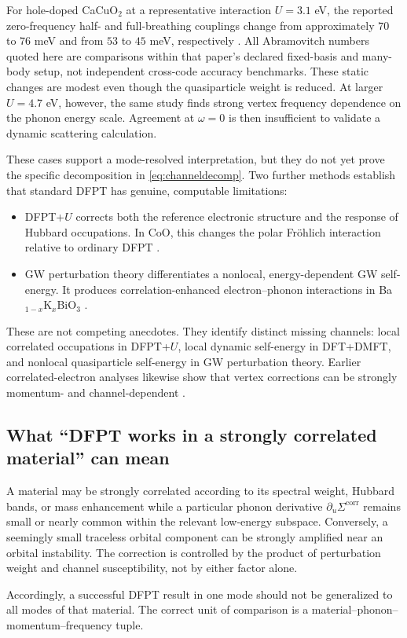 For hole-doped CaCuO$_2$ at a representative interaction $U=3.1$ eV, the reported
zero-frequency half- and full-breathing couplings change from approximately
$70$ to $76$ meV and from $53$ to $45$ meV, respectively
\citep{Abramovitch2025}.  All Abramovitch numbers quoted here are comparisons
within that paper's declared fixed-basis and many-body setup, not independent
cross-code accuracy benchmarks.  These static changes are modest even though the
quasiparticle weight is reduced.  At larger $U=4.7$ eV, however, the same study
finds strong vertex frequency dependence on the phonon energy scale.  Agreement at
$\omega=0$ is then insufficient to validate a dynamic scattering calculation.

These cases support a mode-resolved interpretation, but they do not yet prove the
specific decomposition in \cref{eq:channeldecomp}.  Two further methods establish
that standard DFPT has genuine, computable limitations:

\begin{itemize}
  \item DFPT+$U$ corrects both the reference electronic structure and the response
  of Hubbard occupations.  In CoO, this changes the polar Fr\"ohlich interaction
  relative to ordinary DFPT \citep{Zhou2021}.
  \item GW perturbation theory differentiates a nonlocal, energy-dependent GW
  self-energy.  It produces correlation-enhanced electron--phonon interactions in
  Ba$_{1-x}$K$_x$BiO$_3$ \citep{Li2019}.
\end{itemize}

These are not competing anecdotes.  They identify distinct missing channels:
local correlated occupations in DFPT+$U$, local dynamic self-energy in DFT+DMFT,
and nonlocal quasiparticle self-energy in GW perturbation theory.
Earlier correlated-electron analyses likewise show that vertex corrections can be
strongly momentum- and channel-dependent \citep{Grilli1994}.

\subsection{What ``DFPT works in a strongly correlated material'' can mean}

A material may be strongly correlated according to its spectral weight, Hubbard
bands, or mass enhancement while a particular phonon derivative
$\partial_u\Sigma^{\mathrm{corr}}$ remains small or nearly common within the
relevant low-energy subspace.  Conversely, a seemingly small traceless orbital
component can be strongly amplified near an orbital instability.  The correction
is controlled by the product of perturbation weight and channel susceptibility,
not by either factor alone.

Accordingly, a successful DFPT result in one mode should not be generalized to
all modes of that material.  The correct unit of comparison is a
material--phonon--momentum--frequency tuple.
